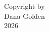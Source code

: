\clearpage
\thispagestyle{empty}
\vspace*{\fill}
\begin{center}
Copyright by\\
Dana Golden\\
2026
\end{center}
